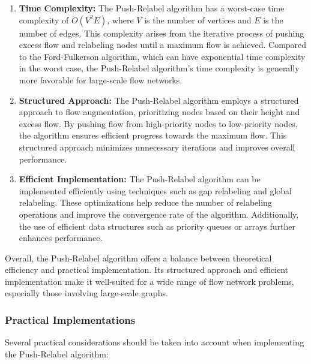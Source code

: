 \documentclass[12pt]{book} %
\begin{document}
\begin{enumerate}
    \item \textbf{Time Complexity:} The Push-Relabel algorithm has a worst-case time complexity of \(O(V^2E)\), where \(V\) is the number of vertices and \(E\) is the number of edges. This complexity arises from the iterative process of pushing excess flow and relabeling nodes until a maximum flow is achieved. Compared to the Ford-Fulkerson algorithm, which can have exponential time complexity in the worst case, the Push-Relabel algorithm's time complexity is generally more favorable for large-scale flow networks.
    
    \item \textbf{Structured Approach:} The Push-Relabel algorithm employs a structured approach to flow augmentation, prioritizing nodes based on their height and excess flow. By pushing flow from high-priority nodes to low-priority nodes, the algorithm ensures efficient progress towards the maximum flow. This structured approach minimizes unnecessary iterations and improves overall performance.
    
    \item \textbf{Efficient Implementation:} The Push-Relabel algorithm can be implemented efficiently using techniques such as gap relabeling and global relabeling. These optimizations help reduce the number of relabeling operations and improve the convergence rate of the algorithm. Additionally, the use of efficient data structures such as priority queues or arrays further enhances performance.
\end{enumerate}

Overall, the Push-Relabel algorithm offers a balance between theoretical efficiency and practical implementation. Its structured approach and efficient implementation make it well-suited for a wide range of flow network problems, especially those involving large-scale graphs.


\subsubsection{Practical Implementations}

Several practical considerations should be taken into account when implementing the Push-Relabel algorithm:
\end{document}
